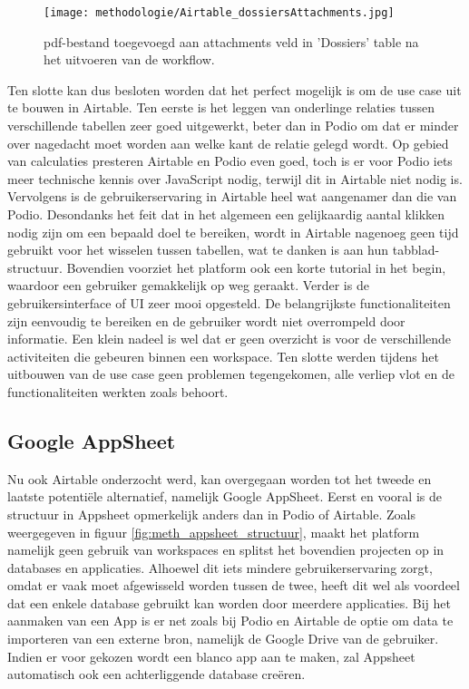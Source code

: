 \begin{figure}[ht]
    \centering
    \texttt{[image: methodologie/Airtable\_dossiersAttachments.jpg]}
    \caption{pdf-bestand toegevoegd aan attachments veld in 'Dossiers' table na het uitvoeren van de workflow.}
    \label{fig:meth_airtable_dossiersAttachments}
\end{figure}

Ten slotte kan dus besloten worden dat het perfect mogelijk is om de use case uit te bouwen in Airtable. Ten eerste is het leggen van onderlinge relaties tussen verschillende tabellen zeer goed uitgewerkt, beter dan in Podio om dat er minder over nagedacht moet worden aan welke kant de relatie gelegd wordt. Op gebied van calculaties presteren Airtable en Podio even goed, toch is er voor Podio iets meer technische kennis over JavaScript nodig, terwijl dit in Airtable niet nodig is. Vervolgens is de gebruikerservaring in Airtable heel wat aangenamer dan die van Podio. Desondanks het feit dat in het algemeen een gelijkaardig aantal klikken nodig zijn om een bepaald doel te bereiken, wordt in Airtable nagenoeg geen tijd gebruikt voor het wisselen tussen tabellen, wat te danken is aan hun tabblad-structuur. Bovendien voorziet het platform ook een korte tutorial in het begin, waardoor een gebruiker gemakkelijk op weg geraakt. Verder is de gebruikersinterface of UI zeer mooi opgesteld. De belangrijkste functionaliteiten zijn eenvoudig te bereiken en de gebruiker wordt niet overrompeld door informatie. Een klein nadeel is wel dat er geen overzicht is voor de verschillende activiteiten die gebeuren binnen een workspace. Ten slotte werden tijdens het uitbouwen van de use case geen problemen tegengekomen, alle verliep vlot en de functionaliteiten werkten zoals behoort. \\

\newpage



\subsection{Google AppSheet} %

Nu ook Airtable onderzocht werd, kan overgegaan worden tot het tweede en laatste potentiële alternatief, namelijk Google AppSheet. Eerst en vooral is de structuur in Appsheet opmerkelijk anders dan in Podio of Airtable. Zoals weergegeven in figuur \ref{fig:meth_appsheet_structuur}, maakt het platform namelijk geen gebruik van workspaces en splitst het bovendien projecten op in databases en applicaties. Alhoewel dit iets mindere gebruikerservaring zorgt, omdat er vaak moet afgewisseld worden tussen de twee, heeft dit wel als voordeel dat een enkele database gebruikt kan worden door meerdere applicaties. Bij het aanmaken van een App is er net zoals bij Podio en Airtable de optie om data te importeren van een externe bron, namelijk de Google Drive van de gebruiker. Indien er voor gekozen wordt een blanco app aan te maken, zal Appsheet automatisch ook een achterliggende database creëren. \\

